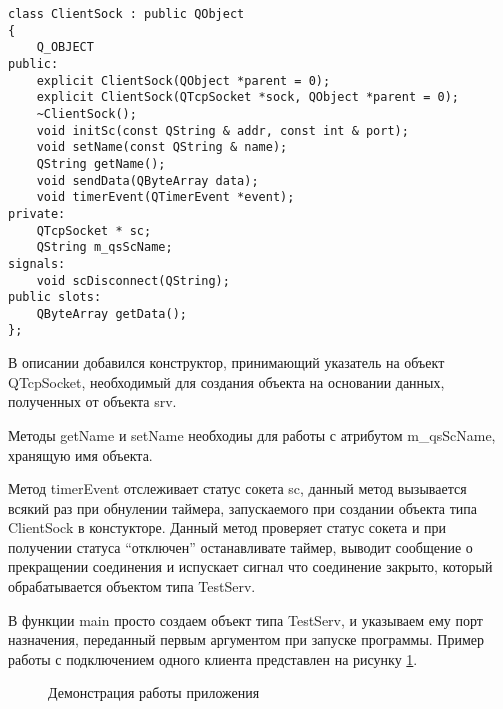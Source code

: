 \begin{lstlisting}
class ClientSock : public QObject
{
    Q_OBJECT
public:
    explicit ClientSock(QObject *parent = 0);
    explicit ClientSock(QTcpSocket *sock, QObject *parent = 0);
    ~ClientSock();
    void initSc(const QString & addr, const int & port);
    void setName(const QString & name);
    QString getName();
    void sendData(QByteArray data);
    void timerEvent(QTimerEvent *event);
private:
    QTcpSocket * sc;
    QString m_qsScName;
signals:
    void scDisconnect(QString);
public slots:
    QByteArray getData();
};
\end{lstlisting}

В описании добавился конструктор, принимающий указатель на объект QTcpSocket, необходимый для создания объекта на основании данных, полученных от объекта srv.

Методы getName и setName необходиы для работы с атрибутом m\_qsScName, хранящую имя объекта.

Метод timerEvent отслеживает статус сокета sc, данный метод вызывается всякий раз при обнулении таймера, запускаемого при создании объекта типа ClientSock в констукторе. Данный метод проверяет статус сокета и при получении статуса ``отключен'' останавливате таймер, выводит сообщение о прекращении соединения и испускает сигнал что соединение закрыто, который обрабатывается объектом типа TestServ.

В функции main просто создаем объект типа TestServ, и указываем ему порт назначения, переданный первым аргументом при запуске программы. Пример работы с подключением одного клиента представлен на рисунку \ref{clientEmul:clientEmul}.

\begin{figure}[h!]
 \caption{Демонстрация работы приложения}
 \label{clientEmul:clientEmul}
\end{figure}
